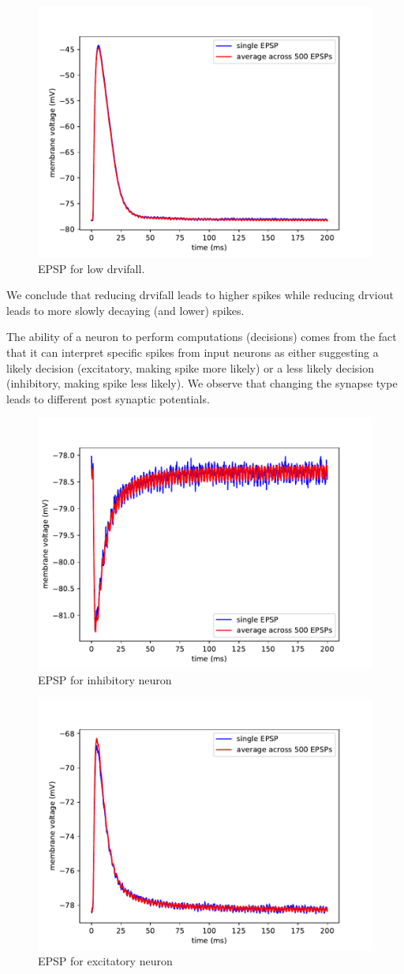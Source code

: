 \documentclass[a4paper,twocolumn]{article}
\begin{document}
\begin{figure}[ht]
    \centering
    \includegraphics[width=.5\textwidth]{figures/epsp_fall_-.pdf}
    \caption{EPSP for low drvifall.}
    \label{fig:epsp_fall-}
\end{figure}
We conclude that reducing drvifall leads to higher spikes while reducing drviout
leads to more slowly decaying (and lower) spikes.  \par
The ability of a neuron to perform computations (decisions) comes from the fact
that it can interpret specific spikes from input neurons as either suggesting
a likely decision (excitatory,  making spike more likely) or  a less likely decision
(inhibitory, making spike less likely).  We observe that changing the synapse type
leads to different post synaptic potentials.
\begin{figure}[ht]
    \centering
    \includegraphics[width=.5\textwidth]{figures/epsp_inh_fall_03_out_05.pdf}
    \caption{EPSP for inhibitory neuron}
    \label{fig:epsp_inh_fall}
\end{figure}
\begin{figure}[ht]
    \centering
    \includegraphics[width=.5\textwidth]{figures/epsp_exc_fall_03_out_05.pdf}
    \caption{EPSP for excitatory neuron}
    \label{fig:epsp_exc_fall}
\end{figure}
\end{document}
